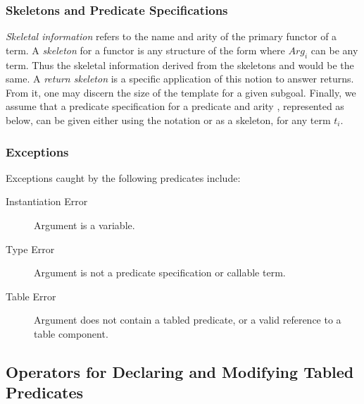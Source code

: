 \subsubsection*{Skeletons and Predicate Specifications}

\emph{Skeletal information} refers to the name and arity of the
primary functor of a term.  A \emph{skeleton} for a functor 
is any structure of the form  where
$Arg_i$ can be any term.  Thus the skeletal information derived from
the skeletons  and  would be the same.  A
\emph{return skeleton} is a specific application of this notion to
answer returns.  From it, one may discern the size of the template for
a given subgoal.  Finally, we assume that a predicate specification
for a predicate  and arity , represented as
 below, can be given either using the notation
 or as a skeleton,  for any term
$t_i$.


\subsubsection*{Exceptions}

Exceptions caught by the following predicates include:
\begin{description}
\item[Instantiation Error] Argument is a variable.
\item[Type Error] Argument is not a predicate specification or callable term.
\item[Table Error] Argument does not contain a tabled predicate, or a valid
	reference to a table component.
\end{description}



\subsection{Operators for Declaring and Modifying Tabled Predicates}
\label{sec:TablePred:Decl&Mod}

